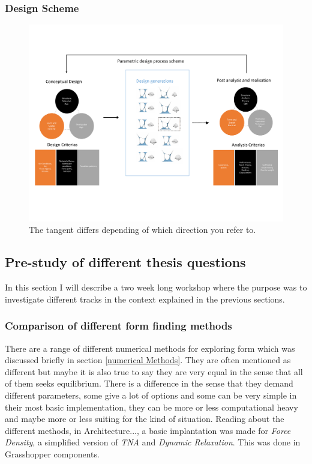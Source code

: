 \subsubsection{Design Scheme}

\begin{figure}[H]
\centering
\includegraphics[width=1.0\linewidth ]{figure/Introduction/DesignScheme.pdf}
\caption{The tangent differs depending of which direction you refer to. }
\end{figure}

\subsection{Pre-study of different thesis questions}
In this section I will describe a two week long workshop where the purpose was to investigate different tracks in the context explained in the previous sections. 

\subsubsection{Comparison of different form finding methods} \label{CompMethods}
There are a range of different numerical methods for exploring form which was discussed briefly in section \ref{numerical Methods}. They are often mentioned as different but maybe it is also true to say they are very equal in the sense that all of them seeks equilibrium. There is a difference in the sense that they demand different parameters, some give a lot of options and some can be very simple in their most basic implementation, they can be more or less computational heavy and maybe more or less suiting for the kind of situation. 
Reading about the different methods, in Architecture..., a basic implantation was made for \textit{Force Density}, a simplified version of \textit{TNA} and \textit{Dynamic Relaxation}. This was done in Grasshopper components. 


